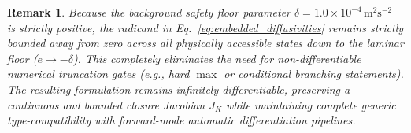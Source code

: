 \documentclass[11pt,letterpaper]{article}
\newtheorem{remark}{Remark}
\begin{document}
\begin{remark}
Because the background safety floor parameter $\delta = 1.0 \times 10^{-4}\,\mathrm{m}^2\mathrm{s}^{-2}$ is strictly positive, the radicand in Eq.~\eqref{eq:embedded_diffusivities} remains strictly bounded away from zero across all physically accessible states down to the laminar floor ($e \to -\delta$). This completely eliminates the need for non-differentiable numerical truncation gates (e.g., hard $\max$ or conditional branching statements). The resulting formulation remains infinitely differentiable, preserving a continuous and bounded closure Jacobian $J_K$ while maintaining complete generic type-compatibility with forward-mode automatic differentiation pipelines.
\end{remark}
\end{document}
